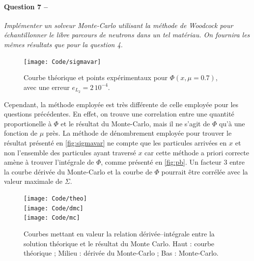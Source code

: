 \message{ !name(rapport_monte_carlo.tex)}\documentclass[12pt,a4paper]{article}
\newcommand{\question}[2]{\paragraph{Question #1 --}\hspace{-7pt}\textit{#2} \\}
\begin{document}
\question{7}{Implémenter un solveur Monte-Carlo utilisant la méthode de Woodcock pour échantillonner le libre parcours de neutrons dans un tel matériau. On fournira les mêmes résultats que pour la question 4.}

\begin{figure}[h]
  \centering
  \texttt{[image: Code/sigmavar]}
  \caption{Courbe théorique et points expérimentaux pour $\Phi(x,\mu = 0.7)$, avec une erreur $e_{L_2}=2\,10^{-4}$.}
  \label{fig:sigmavar}
\end{figure}

Cependant, la méthode employée est très différente de celle employée pour les questions précédentes. En effet, on trouve une correlation entre une quantité proportionelle à $\Phi$ et le résultat du Monte-Carlo, mais il ne s'agit de $\Phi$ qu'à une fonction de $\mu$ près. La méthode de dénombrement employée pour trouver le résultat présenté en \autoref{fig:sigmavar} ne compte que les particules arrivées en $x$ et non l'ensemble des particules ayant traversé $x$ car cette méthode a priori correcte amène à trouver l'intégrale de $\Phi$, comme présenté en \autoref{fig:pb}. Un facteur 3 entre la courbe dérivée du Monte-Carlo et la courbe de $\Phi$ pourrait être corrélée avec la valeur maximale de $\Sigma$. 

\begin{figure}[h]
  \centering
  \texttt{[image: Code/theo]} \\
  \texttt{[image: Code/dmc]} \\
  \texttt{[image: Code/mc]} 
  \caption{Courbes mettant en valeur la relation dérivée--intégrale entre la solution théorique et le résultat du Monte Carlo. Haut : courbe théorique ; Milieu : dérivée du Monte-Carlo ; Bas : Monte-Carlo.}
  \label{fig:pb}
\end{figure}
\end{document}
